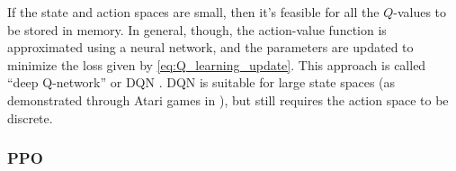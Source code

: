 If the state and action spaces are small, then it's feasible for all the $Q$-values to be stored in memory. In general, though, the action-value function is approximated using a neural network, and the parameters are updated to minimize the loss given by \ref{eq:Q_learning_update}. This approach is called ``deep Q-network'' or DQN \cite{mnih2013playing}. DQN is suitable for large state spaces (as demonstrated through Atari games in \cite{mnih2013playing}), but still requires the action space to be discrete.

%

\subsubsection{PPO}

